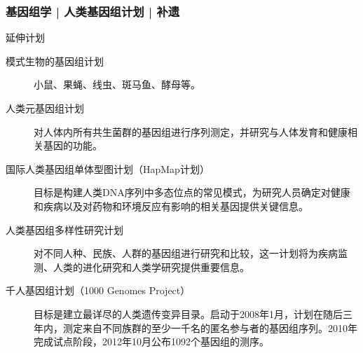 \begin{frame}
  \frametitle{基因组学 | 人类基因组计划 | 补遗}
  \begin{block}{延伸计划}
    \begin{description}
      \item[模式生物的基因组计划] 小鼠、果蝇、线虫、斑马鱼、酵母等。
      \item[人类元基因组计划] 对人体内所有共生菌群的基因组进行序列测定，并研究与人体发育和健康相关基因的功能。
      \item[国际人类基因组单体型图计划（HapMap计划）] 目标是构建人类DNA序列中多态位点的常见模式，为研究人员确定对健康和疾病以及对药物和环境反应有影响的相关基因提供关键信息。
      \item[人类基因组多样性研究计划] 对不同人种、民族、人群的基因组进行研究和比较，这一计划将为疾病监测、人类的进化研究和人类学研究提供重要信息。
      \item[千人基因组计划（1000 Genomes Project）] 目标是建立最详尽的人类遗传变异目录。启动于2008年1月，计划在随后三年内，测定来自不同族群的至少一千名的匿名参与者的基因组序列。2010年完成试点阶段，2012年10月公布1092个基因组的测序。
    \end{description}
  \end{block}
\end{frame}

